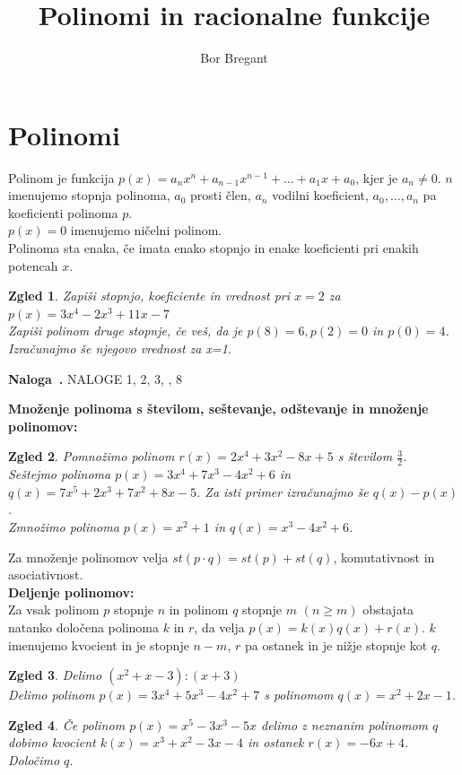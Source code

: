 \documentclass{article}
\title{Polinomi in racionalne funkcije}
\author{Bor Bregant}
\date{\vspace{-5ex}}
\newcounter{example}[section]
\newenvironment{example}[1][]{\refstepcounter{example}\par\medskip
   \noindent \textbf{Naloga~\theexample. #1} \rmfamily}{\medskip}
\newtheorem*{zgled}{Zgled}
\begin{document}
\maketitle


\section{Polinomi}

Polinom je funkcija $p(x)=a_n x^n+a_{n-1}x^{n-1}+\ldots+a_1 x+a_0$, kjer je $a_n\neq 0$. $n$ imenujemo stopnja polinoma, $a_0$ prosti člen, $a_n$ vodilni koeficient, $a_0,\ldots,a_n$ pa koeficienti polinoma $p$.\\
$p(x)=0$ imenujemo ničelni polinom.\\
Polinoma sta enaka, če imata enako stopnjo in enake koeficienti pri enakih potencah $x$.

\begin{zgled}
    \textdagger Zapiši stopnjo, koeficiente in vrednost pri $x=2$ za $p(x)=3x^4-2x^3+11x-7$\\
    \textdagger Zapiši polinom druge stopnje, če veš, da je $p(8)=6, p(2)=0$ in $p(0)=4$. Izračunajmo še njegovo vrednost za x=1.
\end{zgled}

\begin{example}
    NALOGE 1, 2, 3, , 8
\end{example}

\textbf{Množenje polinoma s številom, seštevanje, odštevanje in množenje polinomov:}
\begin{zgled}
    Pomnožimo polinom $r(x)=2x^4+3x^2-8x+5$ s številom $\frac{3}{2}$.\\
    Seštejmo polinoma $p(x)=3x^4+7x^3-4x^2+6$ in $q(x)=7x^5+2x^3+7x^2+8x-5$. Za isti primer izračunajmo še $q(x)-p(x)$.\\
    Zmnožimo polinoma $p(x)=x^2+1$ in $q(x)=x^3-4x^2+6$.
\end{zgled}
Za množenje polinomov velja $st(p\cdot q)=st(p)+st(q)$, komutativnost in asociativnost.\\

\textbf{Deljenje polinomov:}\\

Za vsak polinom $p$ stopnje $n$ in polinom $q$ stopnje $m$ $(n\geq m)$ obstajata natanko določena polinoma $k$ in $r$, da velja $p(x)=k(x)q(x)+r(x)$. $k$ imenujemo kvocient in je stopnje $n-m$, $r$ pa ostanek in je nižje stopnje kot $q$.

\begin{zgled}
    Delimo $(x^2+x-3):(x+3)$\\
    Delimo polinom $p(x)=3x^4+5x^3-4x^2+7$ s polinomom $q(x)=x^2+2x-1$.
\end{zgled}
\begin{zgled}
    Če polinom $p(x)=x^5-3x^3-5x$ delimo z neznanim polinomom $q$ dobimo kvocient $k(x)=x^3+x^2-3x-4$ in ostanek $r(x)=-6x+4$. Določimo $q$.
\end{zgled}
\end{document}
